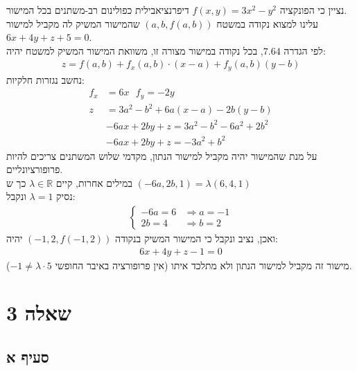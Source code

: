 \documentclass{article}
\def\reals{\mathbb{R}}
\begin{document}
נציין כי הפונקציה $f(x,y)=3x^2-y^2$ דיפרנציאבילית כפולינום רב-משתנים בכל המישור.\\
עלינו למצוא נקודה במשטח $(a,b,f(a,b))$ שהמישור המשיק לה מקביל למישור $6x+4y+z+5=0$. \\
לפי הגדרה $7.64$, בכל נקודה במישור מצורה זו, משוואת המישור המשיק למשטח יהיה:
\begin{align*}
    z=f(a, b)+f_x(a,b)\cdot (x-a)+f_y(a, b)(y-b)
\end{align*}
נחשב נגזרות חלקיות:
\begin{align*}
    f_x & =6x \ \ \ f_y = -2y           \\
    z   & =3a^2-b^2+6a(x-a)-2b(y-b)     \\
        & -6ax+2by+z=3a^2-b^2-6a^2+2b^2 \\
        & -6ax+2by+z=-3a^2+b^2
\end{align*}
על מנת שהמישור יהיה מקביל למישור הנתון, מקדמי שלוש המשתנים צריכים להיות פרופורציונליים. \\
במילים אחרות, קיים $\lambda\in \reals$ כך ש $(-6a, 2b, 1)=\lambda(6,4,1)$ \\
נסיק $\lambda=1$ ונקבל:
\begin{align*}
    \begin{cases}
        -6a=6 & \Rightarrow a=-1 \\
        2b=4  & \Rightarrow b=2
    \end{cases}
\end{align*}
ואכן, נציב ונקבל כי המישור המשיק בנקודה $(-1,2, f(-1,2))$ יהיה:
\begin{align*}
    6x+4y+z-1=0
\end{align*}
מישור זה מקביל למישור הנתון ולא מתלכד איתו (אין פרופורציה באיבר החופשי $-1\ne \lambda\cdot 5$).

\pagebreak

\section*{שאלה 3}

\subsection*{סעיף א}
\end{document}
